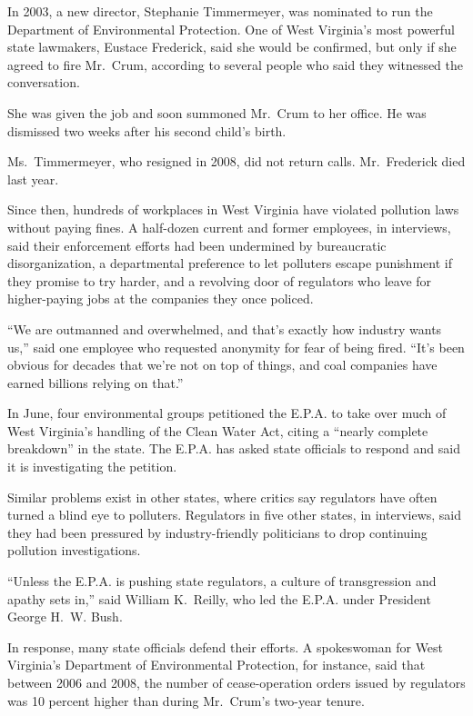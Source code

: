 ﻿\documentclass[12pt]{article}
\begin{document}
In 2003, a new director, Stephanie Timmermeyer, was nominated to run the Department of Environmental
Protection. One of West Virginia's most powerful state lawmakers, Eustace Frederick, said she would
be confirmed, but only if she agreed to fire Mr.~Crum, according to several people who said they
witnessed the conversation.

She was given the job and soon summoned\cite{summon} Mr.~Crum to her office. He was dismissed two
weeks after his second child's birth.

Ms.~Timmermeyer, who resigned in 2008, did not return calls. Mr.~Frederick died last year.

Since then, hundreds of workplaces in West Virginia have violated pollution laws without paying
fines. A half-dozen current and former employees, in interviews, said their enforcement efforts had
been undermined by bureaucratic disorganization, a departmental preference to let polluters escape
punishment if they promise to try harder, and a revolving door of regulators who leave for
higher-paying jobs at the companies they once policed.

``We are outmanned and overwhelmed, and that's exactly how industry wants us,'' said one employee
who requested anonymity for fear of being fired. ``It's been obvious for decades that we're not on
top of things, and coal companies have earned billions relying on that.''

In June, four environmental groups petitioned the E.P.A. to take over much of West Virginia's
handling of the Clean Water Act, citing a ``nearly complete breakdown'' in the state. The E.P.A. has
asked state officials to respond and said it is investigating the petition.

Similar problems exist in other states, where critics say regulators have often turned a blind eye
to polluters. Regulators in five other states, in interviews, said they had been pressured by
industry-friendly politicians to drop continuing pollution investigations.

``Unless the E.P.A. is pushing state regulators, a culture of transgression and apathy\cite{apathy}
sets in,'' said William K.~Reilly, who led the E.P.A. under President George H.~W. Bush.

In response, many state officials defend their efforts. A spokeswoman for West Virginia's Department
of Environmental Protection, for instance, said that between 2006 and 2008, the number of
cease-operation orders issued by regulators was 10 percent higher than during Mr.~Crum's two-year
tenure.
\end{document}
